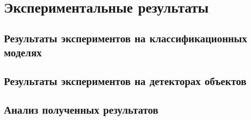 \section{Экспериментальные результаты}
\label{sec:Chapter4} 

\subsection{Результаты экспериментов на классификационных моделях}
\label{sec:results:classification}


\subsection{Результаты экспериментов на детекторах объектов}
\label{sec:results:detection}


\subsection{Анализ полученных результатов}
\label{sec:results:analysis}


\newpage
